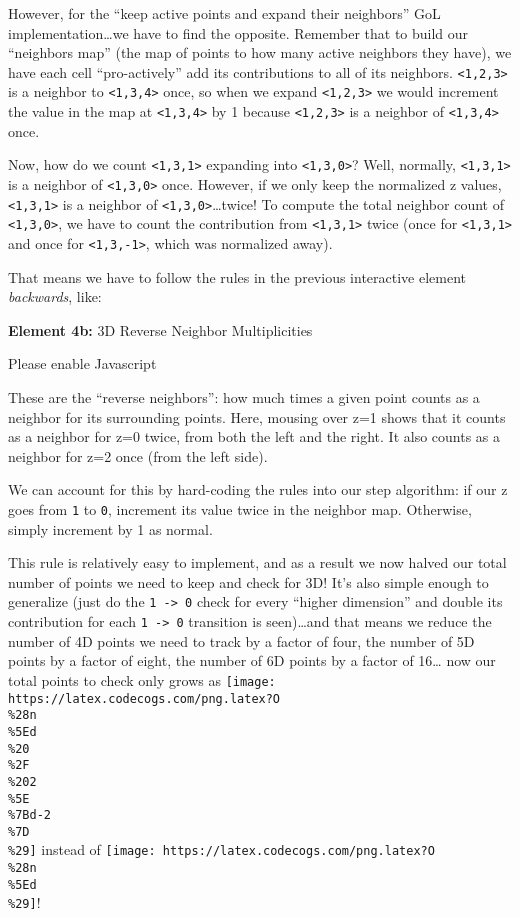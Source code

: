 \documentclass[]{article}
\begin{document}
However, for the ``keep active points and expand their neighbors'' GoL
implementation\ldots we have to find the opposite. Remember that to build our
``neighbors map'' (the map of points to how many active neighbors they have), we
have each cell ``pro-actively'' add its contributions to all of its neighbors.
\texttt{\textless{}1,2,3\textgreater{}} is a neighbor to
\texttt{\textless{}1,3,4\textgreater{}} once, so when we expand
\texttt{\textless{}1,2,3\textgreater{}} we would increment the value in the map
at \texttt{\textless{}1,3,4\textgreater{}} by 1 because
\texttt{\textless{}1,2,3\textgreater{}} is a neighbor of
\texttt{\textless{}1,3,4\textgreater{}} once.

Now, how do we count \texttt{\textless{}1,3,1\textgreater{}} expanding into
\texttt{\textless{}1,3,0\textgreater{}}? Well, normally,
\texttt{\textless{}1,3,1\textgreater{}} is a neighbor of
\texttt{\textless{}1,3,0\textgreater{}} once. However, if we only keep the
normalized z values, \texttt{\textless{}1,3,1\textgreater{}} is a neighbor of
\texttt{\textless{}1,3,0\textgreater{}}\ldots twice! To compute the total
neighbor count of \texttt{\textless{}1,3,0\textgreater{}}, we have to count the
contribution from \texttt{\textless{}1,3,1\textgreater{}} twice (once for
\texttt{\textless{}1,3,1\textgreater{}} and once for
\texttt{\textless{}1,3,-1\textgreater{}}, which was normalized away).

That means we have to follow the rules in the previous interactive element
\emph{backwards}, like:

\leavevmode\hypertarget{golSyms3DReverse}{}%
\textbf{Element 4b:} 3D Reverse Neighbor Multiplicities

\leavevmode\hypertarget{golSyms3DReverseCont}{}%
Please enable Javascript

These are the ``reverse neighbors'': how much times a given point counts as a
neighbor for its surrounding points. Here, mousing over z=1 shows that it counts
as a neighbor for z=0 twice, from both the left and the right. It also counts as
a neighbor for z=2 once (from the left side).

We can account for this by hard-coding the rules into our step algorithm: if our
z goes from \texttt{1} to \texttt{0}, increment its value twice in the neighbor
map. Otherwise, simply increment by 1 as normal.

This rule is relatively easy to implement, and as a result we now halved our
total number of points we need to keep and check for 3D! It's also simple enough
to generalize (just do the \texttt{1\ -\textgreater{}\ 0} check for every
``higher dimension'' and double its contribution for each
\texttt{1\ -\textgreater{}\ 0} transition is seen)\ldots and that means we
reduce the number of 4D points we need to track by a factor of four, the number
of 5D points by a factor of eight, the number of 6D points by a factor of
16\ldots{} now our total points to check only grows as
\texttt{[image: https://latex.codecogs.com/png.latex?O\\\%28n\\\%5Ed\\\%20\\\%2F\\\%202\\\%5E\\\%7Bd-2\\\%7D\\\%29]}
instead of
\texttt{[image: https://latex.codecogs.com/png.latex?O\\\%28n\\\%5Ed\\\%29]}!
\end{document}
